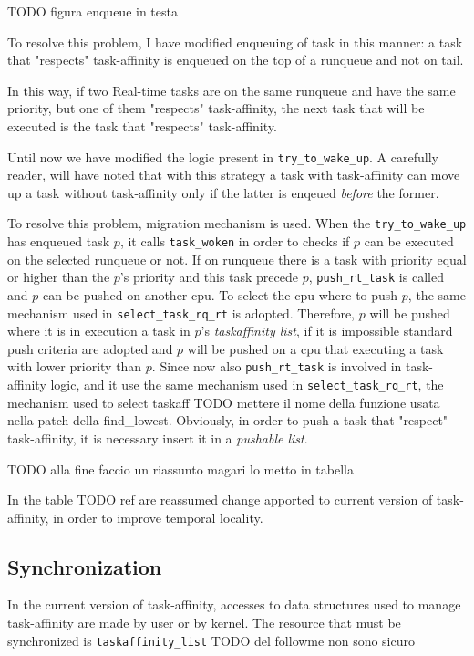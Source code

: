 TODO figura enqueue in testa

To resolve this problem, I have modified enqueuing of task in this manner: a task that "respects" task-affinity is enqueued on the top of a runqueue and not 
on tail. 

In this way, if two Real-time tasks are on the same runqueue and have the same priority, but one of them "respects" task-affinity, the next task that 
will be executed is the task that "respects" task-affinity. 

Until now we have modified the logic present in \texttt{try\_to\_wake\_up}. A carefully reader, will have noted that with this strategy a task with 
task-affinity can move up a task without task-affinity only if the latter is enqeued \textit{before} the former.

To resolve this problem, migration mechanism is used. When the \texttt{try\_to\_wake\_up} has enqueued task $p$, it calls \texttt{task\_woken} in order to
checks if $p$ can be executed on the selected runqueue or not. If on runqueue there is a task with priority equal or higher than the $p$'s priority and 
this task precede $p$, \texttt{push\_rt\_task} is called and $p$ can be pushed on another cpu. To select the cpu where to push $p$, the same mechanism used 
in \texttt{select\_task\_rq\_rt} is adopted. Therefore, $p$ will be pushed where it is in execution a task in $p$'s \textit{taskaffinity list}, if it is 
impossible standard push criteria are adopted and $p$ will be pushed on a cpu that executing a task with lower priority than $p$. Since now also 
\texttt{push\_rt\_task} is involved in task-affinity logic, and it use the same mechanism used in \texttt{select\_task\_rq\_rt},  the mechanism used to 
select taskaff TODO mettere il nome della funzione usata nella patch della find\_lowest. Obviously, in order to push a task that "respect" task-affinity, 
it is necessary insert it in a \textit{pushable list}. 


TODO alla fine faccio un riassunto magari lo metto in tabella

In the table TODO ref are reassumed change apported to current version of task-affinity, in order to improve temporal locality.

\subsection{Synchronization}


In the current version of task-affinity, accesses to data structures used to manage task-affinity are made by user or by kernel. The resource that must be
synchronized is \texttt{taskaffinity\_list} TODO del followme non sono sicuro

